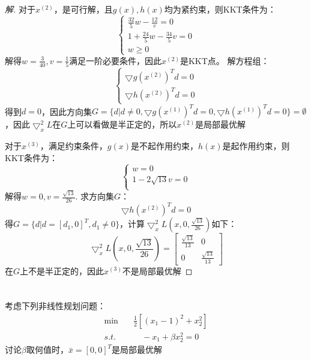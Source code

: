 \documentclass[a4paper]{article}
\begin{document}
\begin{proof}[解]
	对于$x^{(2)}$，是可行解，且$g(x),h(x)$均为紧约束，则KKT条件为：
	\begin{equation}
	\left\{
	\begin{array}{c}
	\frac{32}{5}w-\frac{12}{v}=0 \\
	1+\frac{24}{5}w-\frac{34}{5}v=0 \\
	w\ge 0
	\end{array}
	\right.
	\end{equation}
	解得$w=\frac{3}{40},v=\frac{1}{5}$满足一阶必要条件，因此$x^{(2)}$是KKT点。
	解方程组：
	\begin{equation}
	\left\{
	\begin{array}{c}
	\bigtriangledown g(x^{(2)})^Td=0 \\
	\bigtriangledown h(x^{(2)})^Td=0
	\end{array}
	\right.
	\end{equation}
	得到$d=0$，因此方向集$G=\{d|d\neq0,\bigtriangledown g(x^{(1)})^Td=0,\bigtriangledown h(x^{(1)})^Td=0\}=\emptyset$，因此$\bigtriangledown_x^2 L$在$G$上可以看做是半正定的，所以$x^{(2)}$是局部最优解
	
	对于$x^{(3)}$，满足约束条件，$g(x)$是不起作用约束，$h(x)$是起作用约束，则KKT条件为：
	\begin{equation}
	\left\{
	\begin{array}{c}
	w=0 \\
	1-2\sqrt{13}v=0 \\
	\end{array}
	\right.
	\end{equation}
	解得$w=0,v=\frac{\sqrt{13}}{26}$.
	求方向集$G$：
	\begin{equation}
	\bigtriangledown h(x^{(2)})^Td=0
	\end{equation}
	得$G=\{d|d=[d_1,0]^T,d_1\neq0\}$，计算$\bigtriangledown_x^2 L(x,0,\frac{\sqrt{13}}{26})$如下：
	\begin{equation}
	\bigtriangledown_x^2 L(x,0,\frac{\sqrt{13}}{26})=\left[
	\begin{array}{cc}
	\frac{\sqrt{13}}{13} & 0\\
	0 & \frac{\sqrt{13}}{13}
	\end{array}\right]
	\end{equation}
	在$G$上不是半正定的，因此$x^{(3)}$不是局部最优解
\end{proof}

\section{}
考虑下列非线性规划问题：
\begin{equation}
\begin{aligned}
\min\quad&\frac{1}{2}[(x_1-1)^2+x_2^2] \\
s.t.&\quad -x_1+\beta x_2^2=0
\end{aligned}
\end{equation}
讨论$\beta$取何值时，$\bar{x}=[0,0]^T$是局部最优解
\end{document}
